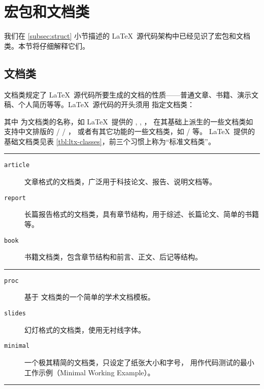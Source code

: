 \section{宏包和文档类}\label{sec:latex-pkgs}

我们在 \ref{subsec:struct} 小节描述的 \LaTeX\ 源代码架构中已经见识了宏包和文档类。本节将仔细解释它们。

\subsection{文档类}\label{subsec:classes}

文档类规定了 \LaTeX\ 源代码所要生成的文档的性质——普通文章、书籍、演示文稿、个人简历等等。\LaTeX\ 源代码的开头须用
指定文档类：
\begin{command}
\end{command}

其中  为文档类的名称，如 \LaTeX\ 提供的 , , ，
在其基础上派生的一些文档类如支持中文排版的  /  / ，
或者有其它功能的一些文档类，如  /  等。
\LaTeX\ 提供的基础文档类见表 \ref{tbl:ltx-classes}，前三个习惯上称为“标准文档类”。

\begin{table}[htp]
\caption{\LaTeX\ 提供的基础文档类}\label{tbl:ltx-classes}
\hrule
\begin{description}
  \item [\texttt{article}] 文章格式的文档类，广泛用于科技论文、报告、说明文档等。
  \item [\texttt{report}] 长篇报告格式的文档类，具有章节结构，用于综述、长篇论文、简单的书籍等。
  \item [\texttt{book}] 书籍文档类，包含章节结构和前言、正文、后记等结构。
\end{description}
\hrule
\begin{description}
  \item [\texttt{proc}] 基于  文档类的一个简单的学术文档模板。
  \item [\texttt{slides}] 幻灯格式的文档类，使用无衬线字体。
  \item [\texttt{minimal}] 一个极其精简的文档类，只设定了纸张大小和字号，
  用作代码测试的最小工作示例（Minimal Working Example）。
\end{description}
\hrule
\end{table}

